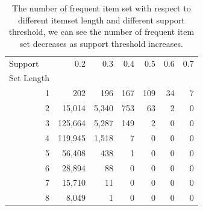 \documentclass[fleqn]{llncs}
\begin{document}
\begin{table}[htbp]
	\centering
	\caption{The number of frequent item set with respect to different itemset length and different support threshold, we can see the number of frequent item set decreases as support threshold increases.}
	\begin{tabular}{rrrrrrr}
		\toprule
		\multicolumn{1}{l}{Support} & 0.2   & 0.3   & 0.4   & 0.5   & 0.6   & 0.7 \\
		\multicolumn{1}{l}{Set Length} &       &       &       &       &       &  \\
		\midrule
		1     & 202   & 196   & 167   & 109   & 34    & 7 \\
		2     & \textcolor[rgb]{ .141,  .161,  .18}{15,014} & \textcolor[rgb]{ .141,  .161,  .18}{5,340} & \textcolor[rgb]{ .141,  .161,  .18}{753} & \textcolor[rgb]{ .141,  .161,  .18}{63} & \textcolor[rgb]{ .141,  .161,  .18}{2} & \textcolor[rgb]{ .141,  .161,  .18}{0} \\
		3     & \textcolor[rgb]{ .141,  .161,  .18}{125,664} & \textcolor[rgb]{ .141,  .161,  .18}{5,287} & \textcolor[rgb]{ .141,  .161,  .18}{149} & \textcolor[rgb]{ .141,  .161,  .18}{2} & \textcolor[rgb]{ .141,  .161,  .18}{0} & \textcolor[rgb]{ .141,  .161,  .18}{0} \\
		4     & \textcolor[rgb]{ .141,  .161,  .18}{119,945} & \textcolor[rgb]{ .141,  .161,  .18}{1,518} & \textcolor[rgb]{ .141,  .161,  .18}{7} & \textcolor[rgb]{ .141,  .161,  .18}{0} & \textcolor[rgb]{ .141,  .161,  .18}{0} & \textcolor[rgb]{ .141,  .161,  .18}{0} \\
		5     & \textcolor[rgb]{ .141,  .161,  .18}{56,408} & \textcolor[rgb]{ .141,  .161,  .18}{438} & \textcolor[rgb]{ .141,  .161,  .18}{1} & \textcolor[rgb]{ .141,  .161,  .18}{0} & \textcolor[rgb]{ .141,  .161,  .18}{0} & \textcolor[rgb]{ .141,  .161,  .18}{0} \\
		6     & \textcolor[rgb]{ .141,  .161,  .18}{28,894} & \textcolor[rgb]{ .141,  .161,  .18}{88} & \textcolor[rgb]{ .141,  .161,  .18}{0} & \textcolor[rgb]{ .141,  .161,  .18}{0} & \textcolor[rgb]{ .141,  .161,  .18}{0} & \textcolor[rgb]{ .141,  .161,  .18}{0} \\
		7     & \textcolor[rgb]{ .141,  .161,  .18}{15,710} & \textcolor[rgb]{ .141,  .161,  .18}{11} & \textcolor[rgb]{ .141,  .161,  .18}{0} & \textcolor[rgb]{ .141,  .161,  .18}{0} & \textcolor[rgb]{ .141,  .161,  .18}{0} & \textcolor[rgb]{ .141,  .161,  .18}{0} \\
		8     & \textcolor[rgb]{ .141,  .161,  .18}{8,049} & \textcolor[rgb]{ .141,  .161,  .18}{1} & \textcolor[rgb]{ .141,  .161,  .18}{0} & \textcolor[rgb]{ .141,  .161,  .18}{0} & \textcolor[rgb]{ .141,  .161,  .18}{0} & \textcolor[rgb]{ .141,  .161,  .18}{0} \\

\end{tabular}
\end{table}
\end{document}
